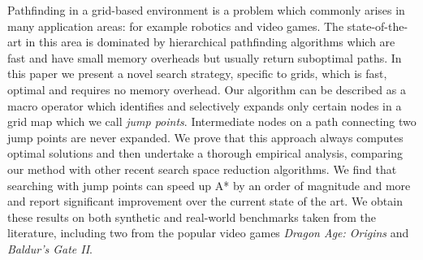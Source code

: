 Pathfinding in a grid-based environment is a problem which commonly arises in
many application areas: for example robotics and video games.  The
state-of-the-art in this area is dominated by hierarchical pathfinding
algorithms which are fast and have small memory overheads but usually return
suboptimal paths.  
In this paper we present a novel search strategy, specific to grids, which is
fast, optimal and requires no memory overhead. Our algorithm can be described as
a macro operator which identifies and selectively expands only certain
nodes in a grid map which we call \emph{jump points}.  Intermediate nodes on a
path connecting two jump points are never expanded.  We prove  
that this approach always computes optimal solutions and then undertake
a thorough empirical analysis, comparing our method with other recent search
space reduction algorithms.  We find that searching with jump points can speed
up A* by an order of magnitude and more and report significant improvement over
the current state of the art.  We obtain these results on both synthetic and
real-world benchmarks taken from the literature, including two from the popular
video games \emph{Dragon Age: Origins} and \emph{Baldur's Gate II}.


